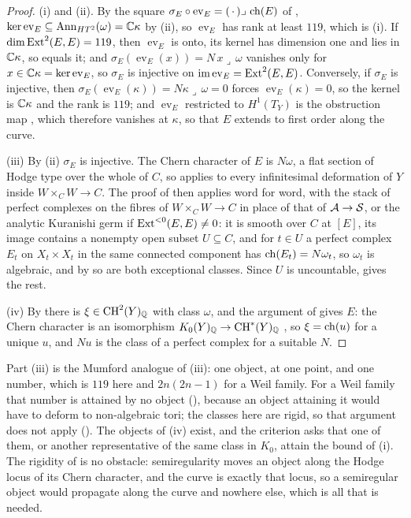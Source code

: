 \begin{proof}
(i) and (ii). By the square $\sigma_{E}\circ\operatorname{ev}_{E}=
(\,\cdot\,)\lrcorner\,\operatorname{ch}(E)$ of , $\ker
\operatorname{ev}_{E}\subseteq\operatorname{Ann}_{HT^{2}}(\omega)=\mathbb{C}\kappa$ by
(ii), so $\operatorname{ev}_{E}$ has rank at least
$119$, which is (i). If $\dim\operatorname{Ext}^{2}(E,E)=119$, then
$\operatorname{ev}_{E}$ is onto, its kernel has dimension one and lies in
$\mathbb{C}\kappa$, so equals it; and $\sigma_{E}(\operatorname{ev}_{E}(x))=
N\,x\lrcorner\,\omega$ vanishes only for $x\in\mathbb{C}\kappa=\ker
\operatorname{ev}_{E}$, so $\sigma_{E}$ is injective on
$\operatorname{im}\operatorname{ev}_{E}=\operatorname{Ext}^{2}(E,E)$. Conversely, if $\sigma_{E}$ is
injective, then $\sigma_{E}(\operatorname{ev}_{E}(\kappa))=N\kappa\lrcorner
\,\omega=0$ forces $\operatorname{ev}_{E}(\kappa)=0$, so the kernel is
$\mathbb{C}\kappa$ and the rank is $119$; and $\operatorname{ev}_{E}$ restricted to
$H^{1}(T_{Y})$ is the obstruction map \cite{Tod09}, which therefore vanishes
at $\kappa$, so that $E$ extends to first order along the curve.

(iii) By (ii) $\sigma_{E}$ is injective. The Chern character of $E$ is
$N\omega$, a flat section of Hodge type over the whole of $C$, so
 applies to every infinitesimal deformation of $Y$ inside
$W\times_{C}W\to C$. The proof of  then applies word
for word, with the stack of perfect complexes on the fibres of $W\times_{C}
W\to C$ \cite{Lie06} in place of that of $\mathcal{A}\to\mathcal{S}$, or the analytic
Kuranishi germ if $\operatorname{Ext}^{<0}(E,E)\ne0$: it is smooth over $C$ at $[E]$, its
image contains a nonempty open subset $U\subseteq C$, and for $t\in U$ a
perfect complex $E_{t}$ on $X_{t}\times X_{t}$ in the same connected
component has $\operatorname{ch}(E_{t})=N\omega_{t}$, so $\omega_{t}$ is algebraic, and by
 so are both exceptional classes. Since $U$ is
uncountable,  gives the rest.

(iv) By  there is $\xi\in\operatorname{CH}^{2}(Y)_{\mathbb{Q}}$ with class
$\omega$, and the argument of  gives $E$: the Chern
character is an isomorphism $K_{0}(Y)_{\mathbb{Q}}\to\operatorname{CH}^{*}(Y)_{\mathbb{Q}}$
\cite[Ex.~15.2.16(b) and Cor.~18.3.2]{Ful98}, so $\xi=\operatorname{ch}(u)$ for a unique
$u$, and $Nu$ is the class of a perfect complex for a suitable $N$.
\end{proof}

Part (iii) is the Mumford analogue of (iii): one object,
at one point, and one number, which is $119$ here and $2n(2n-1)$ for a Weil
family. For a Weil family that number is attained by no object
(), because an object attaining it would have to deform to
non-algebraic tori; the classes here are rigid, so that argument does not
apply (). The objects of (iv) exist, and the criterion
asks that one of them, or another representative of the same class in
$K_{0}$, attain the bound of (i). The rigidity of  is no obstacle:
semiregularity moves an object along the Hodge locus of its Chern character,
and the curve is exactly that locus, so a semiregular object would propagate
along the curve and nowhere else, which is all that is needed.

